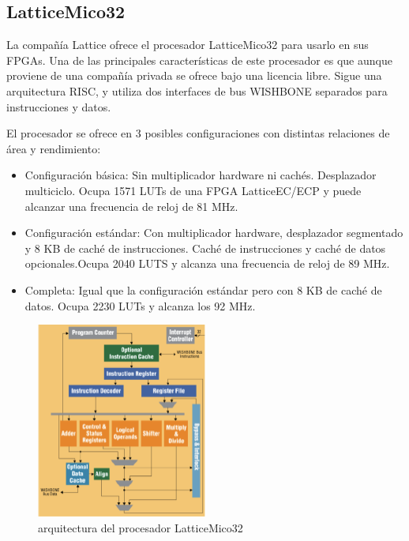 	\subsection{LatticeMico32}
 
La compañía Lattice ofrece el procesador LatticeMico32 para usarlo en sus FPGAs. Una de las principales características de este procesador es que aunque proviene de una compañía privada se ofrece bajo una licencia libre. Sigue una arquitectura RISC, y utiliza dos interfaces de bus WISHBONE \cite{Etiqueta34}separados para instrucciones y datos.

 El procesador se ofrece en 3 posibles configuraciones con distintas relaciones de área y rendimiento:

\begin{itemize}
		  \item Configuración básica: Sin multiplicador hardware ni cachés. Desplazador multiciclo. Ocupa 1571 LUTs de una FPGA LatticeEC/ECP y puede alcanzar una frecuencia de reloj de 81 MHz.
		 \item Configuración estándar: Con multiplicador hardware, desplazador segmentado y 8 KB de caché de instrucciones. Caché de instrucciones y caché de datos opcionales.Ocupa 2040 LUTS y alcanza una frecuencia de reloj de 89 MHz.
 		\item Completa: Igual que la configuración estándar pero con 8 KB de caché de datos. Ocupa 2230 LUTs y alcanza los 92 MHz.
		\end{itemize}

\begin{figure}[h!]
 	\begin{center}
  	\includegraphics[width=0.5\textwidth,keepaspectratio=true]{./images/latice}
  	\caption{arquitectura del procesador LatticeMico32}
 	\end{center}
	\end{figure}

